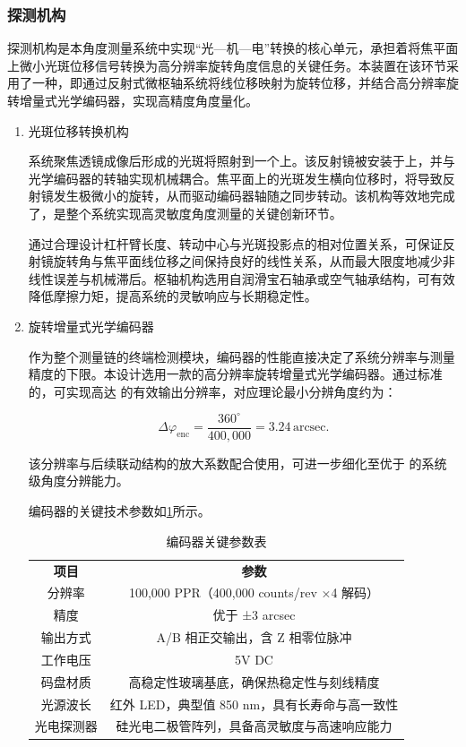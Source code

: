 \subsubsection{探测机构}
探测机构是本角度测量系统中实现“光—机—电”转换的核心单元，承担着将焦平面上微小光斑位移信号转换为高分辨率旋转角度信息的关键任务。本装置在该环节采用了一种，即通过反射式微枢轴系统将线位移映射为旋转位移，并结合高分辨率旋转增量式光学编码器，实现高精度角度量化。

\begin{enumerate}
	\item 光斑位移转换机构
	
	系统聚焦透镜成像后形成的光斑将照射到一个上。该反射镜被安装于上，并与光学编码器的转轴实现机械耦合。焦平面上的光斑发生横向位移时，将导致反射镜发生极微小的旋转，从而驱动编码器轴随之同步转动。该机构等效地完成了，是整个系统实现高灵敏度角度测量的关键创新环节。
	
	通过合理设计杠杆臂长度、转动中心与光斑投影点的相对位置关系，可保证反射镜旋转角与焦平面线位移之间保持良好的线性关系，从而最大限度地减少非线性误差与机械滞后。枢轴机构选用自润滑宝石轴承或空气轴承结构，可有效降低摩擦力矩，提高系统的灵敏响应与长期稳定性。
	
	\item 旋转增量式光学编码器
	
	作为整个测量链的终端检测模块，编码器的性能直接决定了系统分辨率与测量精度的下限。本设计选用一款的高分辨率旋转增量式光学编码器。通过标准的，可实现高达  的有效输出分辨率，对应理论最小分辨角度约为：
	
	$$
	\Delta \varphi_{\text{enc}} = \frac{360^\circ}{400,000} = 3.24\,\text{arcsec}.
	$$
	
	该分辨率与后续联动结构的放大系数配合使用，可进一步细化至优于  的系统级角度分辨能力。
	
	编码器的关键技术参数如\cref{tab:1}所示。
	
	\begin{table}[h!]
		\centering
		\caption{编码器关键参数表}
		\label{tab:1}
		\begin{tabular}{cc}
			\hline
			\textbf{项目} & \textbf{参数} \\
			分辨率 & 100,000 PPR（400,000 counts/rev ×4 解码） \\
			精度 & 优于 ±3 arcsec \\
			输出方式 & A/B 相正交输出，含 Z 相零位脉冲 \\
			工作电压 & 5V DC \\
			码盘材质 & 高稳定性玻璃基底，确保热稳定性与刻线精度 \\
			光源波长 & 红外 LED，典型值 850 nm，具有长寿命与高一致性 \\
			光电探测器 & 硅光电二极管阵列，具备高灵敏度与高速响应能力 \\
			\hline
		\end{tabular}
	\end{table}
	

\end{enumerate}
